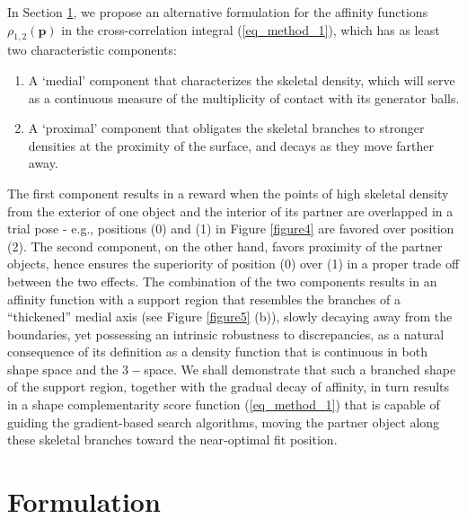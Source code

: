 \documentclass[article]{gmp2014}
\theoremstyle{definition}
\begin{document}
In Section \ref{sec_form}, we propose an alternative formulation for the affinity functions $\rho_{1,2}(\mathbf{p})$ in the cross-correlation integral (\ref{eq_method_1}), which has as least two characteristic components:
%
\begin{enumerate}
    \item A `medial' component that characterizes the skeletal density, which will serve as a continuous measure of the multiplicity of contact with its generator balls.
    \item A `proximal' component that obligates the skeletal branches to stronger densities at the proximity of the surface, and decays as they move farther away.
\end{enumerate}
%
The first component results in a reward when the points of high skeletal density from the exterior of one object and the interior of its partner are overlapped in a trial pose - e.g., positions (0) and (1) in Figure \ref{figure4} are favored over position (2). The second component, on the other hand, favors proximity of the partner objects, hence ensures the superiority of position (0) over (1) in a proper trade off between the two effects. The combination of the two components results in an affinity function with a support region that resembles the branches of a ``thickened'' medial axis (see Figure \ref{figure5} (b)), slowly decaying away from the boundaries, yet possessing an intrinsic robustness to discrepancies, as a natural consequence of its definition as a density function that is continuous in both shape space and the $3-$space. We shall demonstrate that such a branched shape of the support region, together with the gradual decay of affinity, in turn results in a shape complementarity score function (\ref{eq_method_1}) that is capable of guiding the gradient-based search algorithms, moving the partner object along these skeletal branches toward the near-optimal fit position.


\section{Formulation} \label{sec_form}
\end{document}
